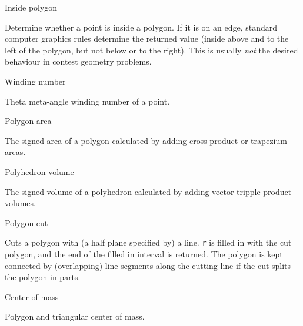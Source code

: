 \begin{algorithm}{Inside polygon}

\desc
Determine whether a point is inside a polygon. If it is on an edge,
standard computer graphics rules determine the returned value (inside above
and to the left of the polygon, but not below or to the right).
This is usually \emph{not} the desired behaviour in contest geometry problems.
\end{algorithm}

\begin{algorithm}{Winding number}

\desc
Theta meta-angle winding number of a point.
\end{algorithm}

\begin{algorithm}{Polygon area}

\desc
The signed area of a polygon calculated by adding cross product or
trapezium areas.
\end{algorithm}

\begin{algorithm}{Polyhedron volume}

\desc
The signed volume of a polyhedron calculated by adding vector tripple
product volumes.
\end{algorithm}

\begin{algorithm}{Polygon cut}

\desc
Cuts a polygon with (a half plane specified by) a line.
{\tt r} is filled in with the cut polygon, and the end of the filled in
interval is returned. The polygon is kept connected by (overlapping)
line segments along the cutting line if the cut splits the polygon in parts.
\end{algorithm}


\begin{algorithm}{Center of mass}

\desc
Polygon and triangular center of mass.
\end{algorithm}
